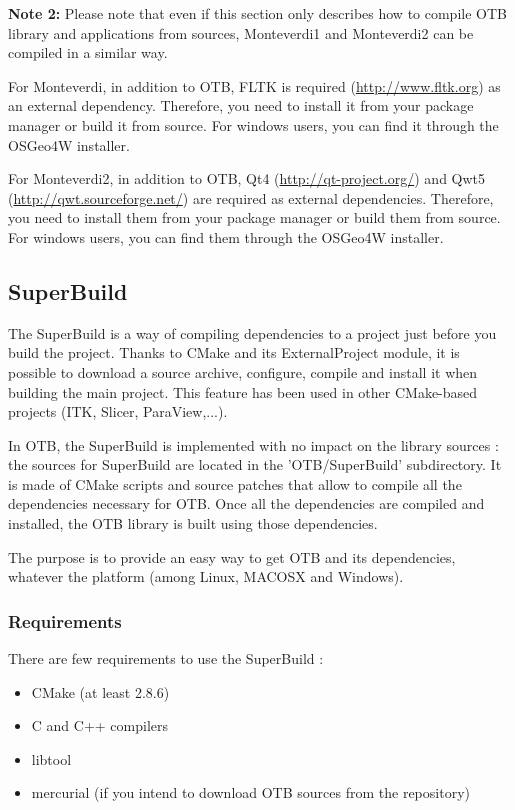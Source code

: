 \textbf{Note 2:} 
Please note that even if this section only describes how to compile OTB library and applications from sources, Monteverdi1 and Monteverdi2 can be compiled in a similar way.

For Monteverdi, in addition to OTB, FLTK is required (\url{http://www.fltk.org}) as an external dependency. Therefore, you need to install it from your package manager or build it from source. For windows users, you can find it through the OSGeo4W installer.

For Monteverdi2, in addition to OTB, Qt4 (\url{http://qt-project.org/}) and Qwt5 (\url{http://qwt.sourceforge.net/}) are required as external dependencies. Therefore, you need to install them from your package manager or build them from source. For windows users, you can find them through the OSGeo4W installer.


\subsection{SuperBuild}
\label{sec:SuperBuild}

The SuperBuild is a way of compiling dependencies to a project just before you build the project. Thanks to CMake and its ExternalProject module, it is possible to download a source archive, configure, compile and install it when building the main project. This feature has been used in other CMake-based projects (ITK, Slicer, ParaView,...).

In OTB, the SuperBuild is implemented with no impact on the library sources : the sources for SuperBuild are located in the 'OTB/SuperBuild' subdirectory. It is made of CMake scripts and source patches that allow to compile all the dependencies necessary for OTB. Once all the dependencies are compiled and installed, the OTB library is built using those dependencies.

The purpose is to provide an easy way to get OTB and its dependencies, whatever the platform (among Linux, MACOSX and Windows). 

\subsubsection{Requirements}
There are few requirements to use the SuperBuild :
\begin{itemize}
	\item CMake (at least 2.8.6)
	\item C and C++ compilers
	\item libtool
	\item mercurial (if you intend to download OTB sources from the repository) 
\end{itemize}

